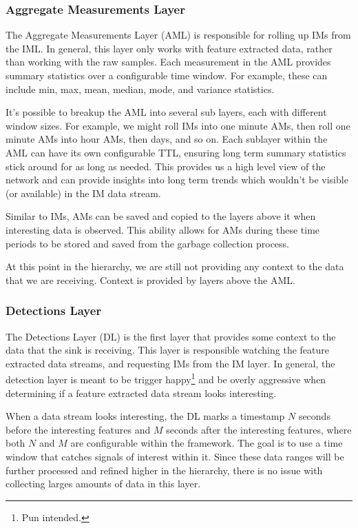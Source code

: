 \subsubsection{Aggregate Measurements Layer}
The Aggregate Measurements Layer (AML) is responsible for rolling up IMs from the IML. In general, this layer only works with feature extracted data, rather than working with the raw samples. Each measurement in the AML provides summary statistics over a configurable time window. For example, these can include min, max, mean, median, mode, and variance statistics. 

It's possible to breakup the AML into several sub layers, each with different window sizes. For example, we might roll IMs into one minute AMs, then roll one minute AMs into hour AMs, then days, and so on. Each sublayer within the AML can have its own configurable TTL, ensuring long term summary statistics stick around for as long as needed. This provides us a high level view of the network and can provide insights into long term trends which wouldn't be visible (or available) in the IM data stream.

Similar to IMs, AMs can be saved and copied to the layers above it when interesting data is observed. This ability allows for AMs during these time periods to be stored and saved from the garbage collection process.

At this point in the hierarchy, we are still not providing any context to the data that we are receiving. Context is provided by layers above the AML.

\subsubsection{Detections Layer}
The Detections Layer (DL) is the first layer that provides some context to the data that the sink is receiving. This layer is responsible watching the feature extracted data streams, and requesting IMs from the IM layer. In general, the detection layer is meant to be trigger happy\footnote{Pun intended.} and be overly aggressive when determining if a feature extracted data stream looks interesting. 

When a data stream looks interesting, the DL marks a timestamp $N$ seconds before the interesting features and $M$ seconds after the interesting features, where both $N$ and $M$ are configurable within the framework. The goal is to use a time window that catches signals of interest within it. Since these data ranges will be further processed and refined higher in the hierarchy, there is no issue with collecting larges amounts of data in this layer. 

